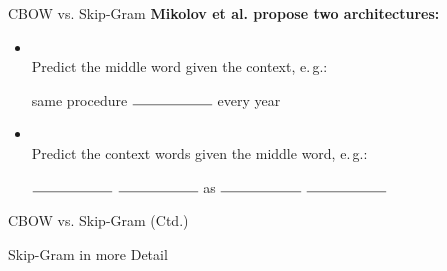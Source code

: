 \begin{frame}{CBOW vs. Skip-Gram}{}
	\textbf{Mikolov et al. propose two architectures:} \vspace*{2mm}
	\begin{itemize}
		\item {} \\
			Predict the middle word given the context, e.\,g.:
		\vspace*{2mm}
		\begin{center}
			same procedure $\rule{2cm}{0.15mm}$ every year
		\end{center}
		\vspace*{2mm}
		\item {} \\
			Predict the context words given the middle word, e.\,g.:
		\vspace*{2mm}
		\begin{center}
			$\rule{2cm}{0.15mm}$ $\rule{2cm}{0.15mm}$ as $\rule{2cm}{0.15mm}$ $\rule{2cm}{0.15mm}$
		\end{center}
	\end{itemize}
\end{frame}


\begin{frame}{CBOW vs. Skip-Gram (Ctd.)}{}
\end{frame}


\begin{frame}{Skip-Gram in more Detail}{}
\end{frame}


\begin{frame}[plain]{}{}
	
\end{frame}


